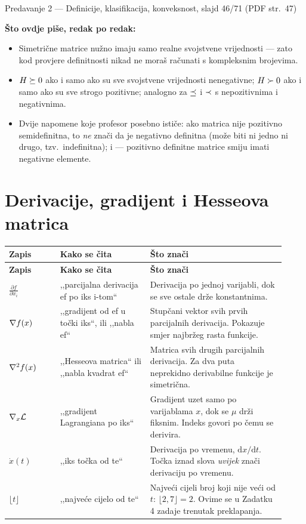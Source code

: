 \begin{izvor}{Predavanje 2 --- Definicije, klasifikacija, konveksnost, slajd 46/71 (PDF str.~47)}

\textbf{Što ovdje piše, redak po redak:}
\begin{itemize}[nosep,leftmargin=*]
  \item Simetrične matrice nužno imaju samo realne svojstvene vrijednosti ---
        zato kod provjere definitnosti nikad ne moraš računati s kompleksnim
        brojevima.
  \item $H \succeq 0$ ako i samo ako su sve svojstvene vrijednosti nenegativne;
        $H \succ 0$ ako i samo ako su sve strogo pozitivne; analogno za
        $\preceq$ i $\prec$ s nepozitivnima i negativnima.
  \item Dvije napomene koje profesor posebno ističe: ako matrica nije pozitivno
        semidefinitna, to \emph{ne} znači da je negativno definitna (može biti
        ni jedno ni drugo, tzv.\ indefinitna); i --- pozitivno definitne matrice
        smiju imati negativne elemente.
\end{itemize}
\end{izvor}

\section{Derivacije, gradijent i Hesseova matrica}
\label{sec:derivacije-oznake}

\begin{longtable}{@{}p{0.17\linewidth} p{0.30\linewidth} p{0.45\linewidth}@{}}
\toprule
\textbf{Zapis} & \textbf{Kako se čita} & \textbf{Što znači} \\
\midrule
\endfirsthead
\toprule
\textbf{Zapis} & \textbf{Kako se čita} & \textbf{Što znači} \\
\midrule
\endhead
$\frac{\partial f}{\partial x_i}$ & ,,parcijalna derivacija ef po iks i-tom`` & Derivacija po jednoj varijabli, dok se sve ostale drže konstantnima. \\[4pt]
$\nabla f(x)$ & ,,gradijent od ef u točki iks``, ili ,,nabla ef`` & Stupčani vektor svih prvih parcijalnih derivacija. Pokazuje smjer najbržeg rasta funkcije. \\[4pt]
$\nabla^2 f(x)$ & ,,Hesseova matrica`` ili ,,nabla kvadrat ef`` & Matrica svih drugih parcijalnih derivacija. Za dva puta neprekidno derivabilne funkcije je simetrična. \\[4pt]
$\nabla_x \mathcal{L}$ & ,,gradijent Lagrangiana po iks`` & Gradijent uzet samo po varijablama $x$, dok se $\mu$ drži fiksnim. Indeks govori po čemu se derivira. \\[4pt]
$\dot{x}(t)$ & ,,iks točka od te`` & Derivacija po vremenu, $\mathrm{d}x/\mathrm{d}t$. Točka iznad slova \emph{uvijek} znači derivaciju po vremenu. \\[4pt]
$\lfloor t \rfloor$ & ,,najveće cijelo od te`` & Najveći cijeli broj koji nije veći od $t$: $\lfloor 2{,}7 \rfloor = 2$. Ovime se u Zadatku 4 zadaje trenutak preklapanja. \\
\bottomrule
\end{longtable}

